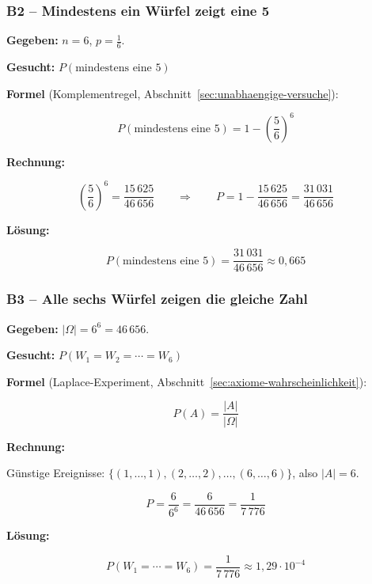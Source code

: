 \subsubsection*{B2 – Mindestens ein Würfel zeigt eine 5}

\begin{beispiel}

\textbf{Gegeben:} $n = 6$, $p = \tfrac{1}{6}$.

\textbf{Gesucht:} $P(\text{mindestens eine 5})$

\textbf{Formel} (Komplementregel, Abschnitt~\ref{sec:unabhaengige-versuche}):

$$
P(\text{mindestens eine 5}) = 1 - \left(\frac{5}{6}\right)^{6}
$$

\textbf{Rechnung:}

$$
\left(\frac{5}{6}\right)^{6} = \frac{15\,625}{46\,656}
\qquad\Rightarrow\qquad
P = 1 - \frac{15\,625}{46\,656} = \frac{31\,031}{46\,656}
$$

\textbf{Lösung:}

$$
\boxed{P(\text{mindestens eine 5}) = \frac{31\,031}{46\,656} \approx 0{,}665}
$$

\end{beispiel}

\subsubsection*{B3 – Alle sechs Würfel zeigen die gleiche Zahl}

\begin{beispiel}

\textbf{Gegeben:} $|\Omega| = 6^6 = 46\,656$.

\textbf{Gesucht:} $P(W_1 = W_2 = \cdots = W_6)$

\textbf{Formel} (Laplace-Experiment, Abschnitt~\ref{sec:axiome-wahrscheinlichkeit}):

$$
P(A) = \frac{|A|}{|\Omega|}
$$

\textbf{Rechnung:}

Günstige Ereignisse: $\{(1,\ldots,1),(2,\ldots,2),\ldots,(6,\ldots,6)\}$, also $|A| = 6$.

$$
P = \frac{6}{6^6} = \frac{6}{46\,656} = \frac{1}{7\,776}
$$

\textbf{Lösung:}

$$
\boxed{P(W_1 = \cdots = W_6) = \frac{1}{7\,776} \approx 1{,}29 \cdot 10^{-4}}
$$

\end{beispiel}

